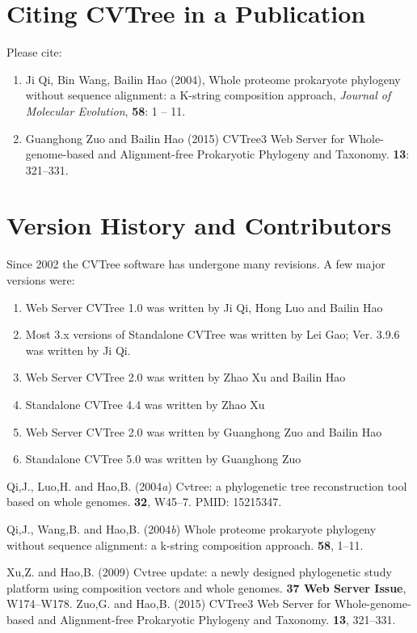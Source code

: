 \documentclass[a4paper,12pt]{article}
\begin{document}
\section{Citing CVTree in a Publication}

Please cite:
\begin{enumerate}\itemsep 0pt
\item Ji Qi, Bin Wang, Bailin Hao (2004), Whole proteome prokaryote
  phylogeny without sequence alignment: a K-string composition approach,
  {\it Journal of Molecular Evolution}, {\bf 58}: 1 -- 11.
\item Guanghong Zuo and Bailin Hao (2015) CVTree3 Web Server for Whole-genome-based and Alignment-free Prokaryotic Phylogeny and Taxonomy.
 {\bf 13}: 321--331.
\end{enumerate}


\section{Version History and Contributors}

Since 2002 the CVTree software has undergone many revisions. A few major
versions were:
\begin{enumerate}\itemsep 0pt
\item Web Server CVTree 1.0 was written by Ji Qi, Hong Luo and Bailin Hao
\item Most 3.x versions of Standalone CVTree was written by Lei Gao;
  Ver. 3.9.6 was written by Ji Qi.
\item Web Server CVTree 2.0 was written by Zhao Xu and Bailin Hao
\item Standalone CVTree 4.4 was written by Zhao Xu
\item Web Server CVTree 2.0 was written by Guanghong Zuo and Bailin Hao
\item Standalone CVTree 5.0 was written by Guanghong Zuo
\end{enumerate}

\begin{thebibliography}{}
Qi,J., Luo,H.  and Hao,B. (2004{\em{a}}) Cvtree: a phylogenetic tree
  reconstruction tool based on whole genomes.
 {\bf 32}, W45--7.
\newblock PMID: 15215347.

Qi,J., Wang,B.  and Hao,B. (2004{\em{b}}) Whole proteome prokaryote phylogeny
  without sequence alignment: a k-string composition approach.
 {\bf 58}, 1--11.

Xu,Z. and Hao,B. (2009{\em{}}) Cvtree update: a newly designed phylogenetic
  study platform using composition vectors and whole genomes.
 {\bf 37 Web Server Issue}, W174--W178.
Zuo,G. and Hao,B. (2015{\em{}}) CVTree3 Web Server for Whole-genome-based and Alignment-free Prokaryotic Phylogeny and Taxonomy.
 {\bf 13}, 321--331.
\end{thebibliography}
\end{document}
